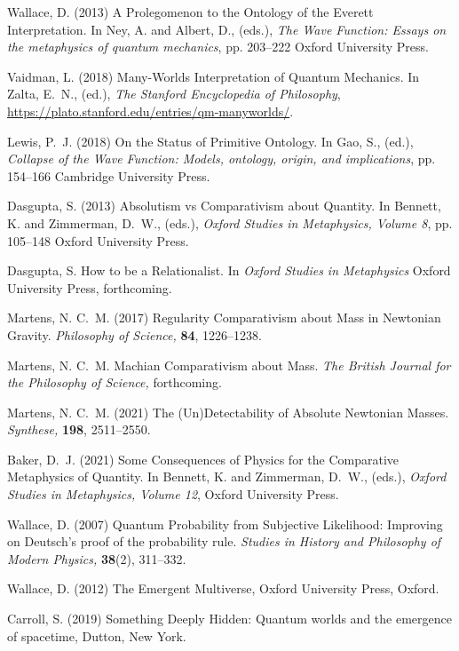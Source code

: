 \documentclass[onecolumn,secnumarabic,amsmath,amssymb,balancelastpage,nofootinbib]{article}
\begin{document}
\begin{thebibliography}{100}
Wallace, D. (2013)
A Prolegomenon to the Ontology of the Everett Interpretation.
In Ney, A. and Albert, D., (eds.), \emph{The Wave Function: Essays on the
  metaphysics of quantum mechanics},  pp. 203--222 Oxford University Press.

Vaidman, L. (2018)
Many-Worlds Interpretation of Quantum Mechanics.
In Zalta, E.~N., (ed.), \emph{The {Stanford} Encyclopedia of Philosophy},
\url{https://plato.stanford.edu/entries/qm-manyworlds/}.

Lewis, P.~J. (2018)
On the Status of Primitive Ontology.
In Gao, S., (ed.), \emph{Collapse of the Wave Function: Models, ontology,
  origin, and implications},  pp. 154--166 Cambridge University Press.

Dasgupta, S. (2013)
Absolutism vs Comparativism about Quantity.
In Bennett, K. and Zimmerman, D.~W., (eds.), \emph{Oxford Studies in
  Metaphysics, Volume 8},  pp. 105--148 Oxford University Press.

Dasgupta, S.
How to be a Relationalist.
In \emph{Oxford Studies in Metaphysics} Oxford University Press,
forthcoming.

Martens, N. C.~M. (2017)
Regularity Comparativism about Mass in Newtonian Gravity.
{\em Philosophy of Science,} {\bf 84}, 1226--1238.

Martens, N. C.~M.
Machian Comparativism about Mass.
{\em The British Journal for the Philosophy of Science,}
forthcoming.

Martens, N. C.~M. (2021)
The (Un)Detectability of Absolute Newtonian Masses.
{\em Synthese,} {\bf 198}, 2511--2550.

Baker, D.~J. (2021)
Some Consequences of Physics for the Comparative Metaphysics of Quantity.
In Bennett, K. and Zimmerman, D.~W., (eds.), \emph{Oxford Studies in
  Metaphysics, Volume 12},  Oxford University Press.

Wallace, D. (2007)
Quantum Probability from Subjective Likelihood: Improving on Deutsch's proof of
  the probability rule.
{\em Studies in History and Philosophy of Modern Physics,} {\bf 38}(2),
  311--332.

Wallace, D. (2012)
The Emergent Multiverse,
Oxford University Press, Oxford.

Carroll, S. (2019)
Something Deeply Hidden: Quantum worlds and the emergence of spacetime,
Dutton, New York.


\end{thebibliography}
\end{document}
